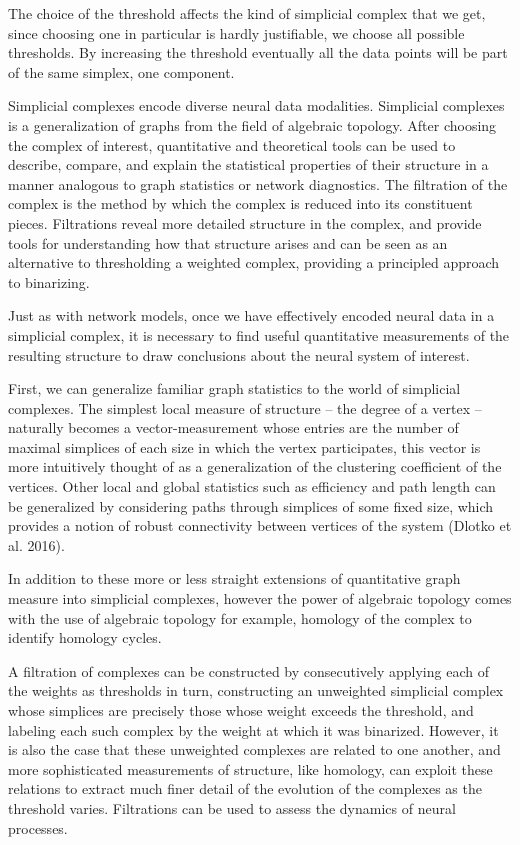 \documentclass[onecollarge,runningheads]{svjour2}
\begin{document}
The choice of the threshold affects the kind of simplicial complex that we get, since choosing one in particular is hardly justifiable, we choose all possible thresholds. By increasing the threshold eventually all the data points will be part of the same simplex, one component.

Simplicial complexes encode diverse neural data modalities. Simplicial complexes is a generalization of graphs from the field of algebraic topology. After choosing the complex of interest, quantitative and theoretical tools can be used to describe, compare, and explain the statistical properties of their structure in a manner analogous to graph statistics or network diagnostics.
The filtration of the complex is the method by which the complex is reduced into its constituent pieces. Filtrations reveal more detailed structure in the complex, and provide tools for understanding how that structure arises and can be seen as an alternative to thresholding a weighted complex, providing a principled approach to binarizing.

Just as with network models, once we have effectively encoded neural data in a simplicial complex, it is necessary to find useful quantitative measurements of the resulting structure to draw conclusions about the neural system of interest.

First, we can generalize familiar graph statistics to the world of simplicial complexes. The simplest local measure of structure – the degree of a vertex – naturally becomes a vector-measurement whose entries are the number of maximal simplices of each size in which the vertex participates, this vector is more intuitively thought of as a generalization of the clustering coefficient of the vertices. Other local and global statistics such as efficiency and path length can be generalized by considering paths through simplices of some fixed size, which provides a notion of robust connectivity between vertices of the system (Dlotko et al. 2016).

In addition to these more or less straight extensions of quantitative graph measure into simplicial complexes, however the power of algebraic topology comes with the use of algebraic topology for example, homology of the complex to identify homology cycles.

A filtration of complexes can be constructed by consecutively applying each of the weights as thresholds in turn, constructing an unweighted simplicial complex whose simplices are precisely those whose weight exceeds the threshold, and labeling each such complex by the weight at which it was binarized. However, it is also the case that these unweighted complexes are related to one another, and more sophisticated measurements of structure, like homology, can exploit these relations to extract much finer detail of the evolution of the complexes as the threshold varies.
Filtrations can be used to assess the dynamics of neural processes.
\end{document}
